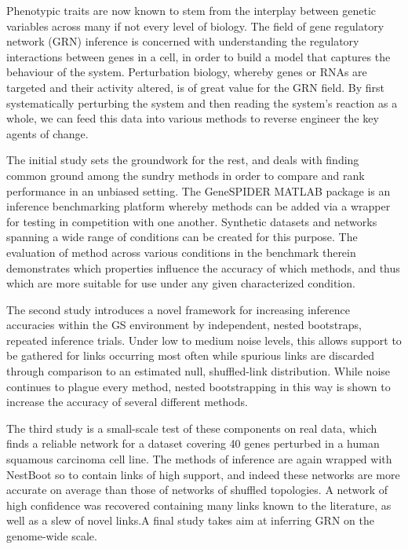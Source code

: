 
\begin{abstracts}

Phenotypic traits are now known to stem from the interplay between genetic variables across many if not every level of biology. The field of gene regulatory network (GRN) inference is concerned with understanding the regulatory interactions between genes in a cell, in order to build a model that captures the behaviour of the system. Perturbation biology, whereby genes or RNAs are targeted and their activity altered, is of great value for the GRN field. By first systematically perturbing the system and then reading the system's reaction as a whole, we can feed this data into various methods to reverse engineer the key agents of change. 

The initial study sets the groundwork for the rest, and deals with finding common ground among the sundry methods in order to compare and rank performance in an unbiased setting. The GeneSPIDER MATLAB package is an inference benchmarking platform whereby methods can be added via a wrapper for testing in competition with one another. Synthetic datasets and networks spanning a wide range of conditions can be created for this purpose. The evaluation of method across various conditions in the benchmark therein demonstrates which properties influence the accuracy of which methods, and thus which are more suitable for use under any given characterized condition.

The second study introduces a novel framework for increasing inference accuracies within the GS environment by independent, nested bootstraps, \ie repeated inference trials. Under low to medium noise levels, this allows support to be gathered for links occurring most often while spurious links are discarded through comparison to an estimated null, shuffled-link distribution. While noise continues to plague every method, nested bootstrapping in this way is shown to increase the accuracy of several different methods.

The third study is a small-scale test of these components on real data, which finds a reliable network for a dataset covering 40 genes perturbed in a human squamous carcinoma cell line. The methods of inference are again wrapped with NestBoot so to contain links of high support, and indeed these networks are more accurate on average than those of networks of shuffled topologies. A network of high confidence was recovered containing many links known to the literature, as well as a slew of novel links.A final study takes aim at inferring GRN on the genome-wide scale.


\end{abstracts}
